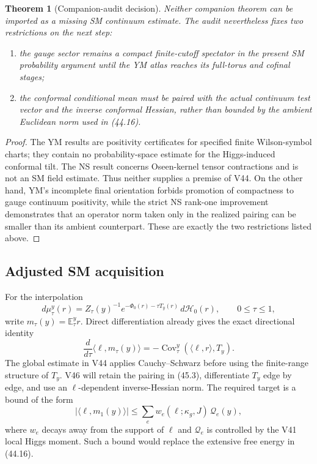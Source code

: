 \documentclass[11pt]{article}
\newtheorem{theorem}{Theorem}[section]
\theoremstyle{remark}
\begin{document}
\begin{theorem}[Companion-audit decision]
\label{thm:v17v45-decision}
Neither companion theorem can be imported as a missing SM continuum
estimate.  The audit nevertheless fixes two restrictions on the next
step:
\begin{enumerate}
\item the gauge sector remains a compact finite-cutoff spectator in
      the present SM probability argument until the YM atlas reaches
      its full-torus and cofinal stages;
\item the conformal conditional mean must be paired with the actual
      continuum test vector and the inverse conformal Hessian, rather
      than bounded by the ambient Euclidean norm used in (44.16).
\end{enumerate}
\end{theorem}

\begin{proof}
The YM results are positivity certificates for specified finite
Wilson-symbol charts; they contain no probability-space estimate for
the Higgs-induced conformal tilt.  The NS result concerns Oseen-kernel
tensor contractions and is not an SM field estimate.  Thus neither
supplies a premise of V44.  On the other hand, YM's incomplete final
orientation forbids promotion of compactness to gauge continuum
positivity, while the strict NS rank-one improvement demonstrates that
an operator norm taken only in the realized pairing can be smaller
than its ambient counterpart.  These are exactly the two restrictions
listed above.
\end{proof}

\subsection{Adjusted SM acquisition}

For the interpolation
\[
 d\mu_\tau^y(r)
 =
 Z_\tau(y)^{-1}
 e^{-\Phi_0(r)-\tau T_y(r)}\,d\mathcal H_0(r),
 \qquad0\leq\tau\leq1,                             \tag{45.2}
\]
write \(m_\tau(y)=\mathbb E_\tau^y r\).  Direct differentiation already
gives the exact directional identity
\[
 \frac{d}{d\tau}\langle\ell,m_\tau(y)\rangle
 =
 -\operatorname{Cov}_\tau^y(\langle\ell,r\rangle,T_y).           \tag{45.3}
\]
The global estimate in V44 applies Cauchy--Schwarz before using the
finite-range structure of \(T_y\).  V46 will retain the pairing in
(45.3), differentiate \(T_y\) edge by edge, and use an
\(\ell\)-dependent inverse-Hessian norm.  The required target is a
bound of the form
\[
 |\langle\ell,m_1(y)\rangle|
 \leq
 \sum_e w_e(\ell;\kappa_g,J)
 \,\mathcal Q_e(y),                                \tag{45.4}
\]
where \(w_e\) decays away from the support of \(\ell\) and
\(\mathcal Q_e\) is controlled by the V41 local Higgs moment.  Such a
bound would replace the extensive free energy in (44.16).
\end{document}
